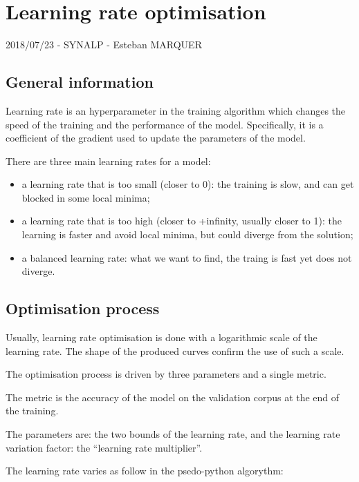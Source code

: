 \section*{Learning rate optimisation}

2018/07/23 - SYNALP - Esteban MARQUER

\subsection{General information}

Learning rate is an hyperparameter in the training algorithm which
changes the speed of the training and the performance of the model.
Specifically, it is a coefficient of the gradient used to update the
parameters of the model.

There are three main learning rates for a model:
\begin{itemize}
\item a learning rate that is too small (closer to 0): the training is slow, and can get blocked in some local minima;
\item a learning rate that is too high (closer to +infinity, usually closer to 1): the learning is faster and avoid local minima, but could diverge from the solution;
\item a balanced learning rate: what we want to find, the traing is fast yet does not diverge.
\end{itemize}

\subsection{Optimisation process}

Usually, learning rate optimisation is done with a logarithmic scale of
the learning rate. The shape of the produced curves confirm the use of
such a scale.

The optimisation process is driven by three parameters and a single
metric.

The metric is the accuracy of the model on the validation corpus at the
end of the training.

The parameters are: the two bounds of the learning rate, and the
learning rate variation factor: the ``learning rate multiplier''.

The learning rate varies as follow in the psedo-python algorythm:

